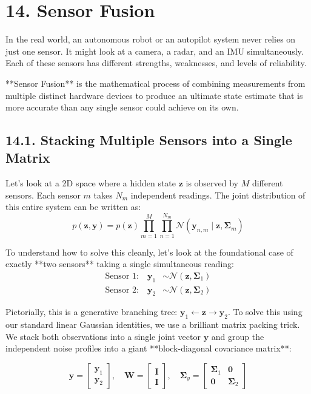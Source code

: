 \documentclass{article}
\begin{document}
\section*{14. Sensor Fusion}

In the real world, an autonomous robot or an autopilot system never relies on just one sensor. It might look at a camera, a radar, and an IMU simultaneously. Each of these sensors has different strengths, weaknesses, and levels of reliability. 

**Sensor Fusion** is the mathematical process of combining measurements from multiple distinct hardware devices to produce an ultimate state estimate that is more accurate than any single sensor could achieve on its own.

\subsection*{14.1. Stacking Multiple Sensors into a Single Matrix}
Let's look at a 2D space where a hidden state $\mathbf{z}$ is observed by $M$ different sensors. Each sensor $m$ takes $N_m$ independent readings. The joint distribution of this entire system can be written as:
\begin{equation}
p(\mathbf{z}, \mathbf{y}) = p(\mathbf{z}) \prod_{m=1}^M \prod_{n=1}^{N_m} \mathcal{N}(\mathbf{y}_{n,m} \mid \mathbf{z}, \boldsymbol{\Sigma}_m) \tag{69}
\end{equation}

To understand how to solve this cleanly, let's look at the foundational case of exactly **two sensors** taking a single simultaneous reading:
\begin{align*}
\text{Sensor 1:} \quad \mathbf{y}_1 &\sim \mathcal{N}(\mathbf{z}, \boldsymbol{\Sigma}_1) \\
\text{Sensor 2:} \quad \mathbf{y}_2 &\sim \mathcal{N}(\mathbf{z}, \boldsymbol{\Sigma}_2)
\end{align*}

Pictorially, this is a generative branching tree: $\mathbf{y}_1 \leftarrow \mathbf{z} \rightarrow \mathbf{y}_2$. To solve this using our standard linear Gaussian identities, we use a brilliant matrix packing trick. We stack both observations into a single joint vector $\mathbf{y}$ and group the independent noise profiles into a giant **block-diagonal covariance matrix**:

\begin{equation}
\mathbf{y} = \begin{bmatrix} \mathbf{y}_1 \\ \mathbf{y}_2 \end{bmatrix}, \quad \mathbf{W} = \begin{bmatrix} \mathbf{I} \\ \mathbf{I} \end{bmatrix}, \quad \boldsymbol{\Sigma}_y = \begin{bmatrix} \boldsymbol{\Sigma}_1 & \mathbf{0} \\ \mathbf{0} & \boldsymbol{\Sigma}_2 \end{bmatrix} \tag{70}
\end{equation}
\end{document}
